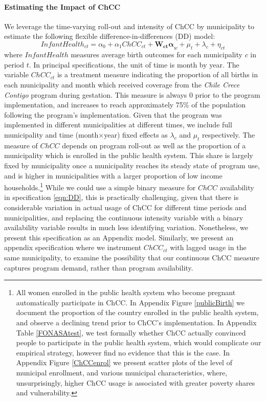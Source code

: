 \documentclass[12pt]{article}
\begin{document}
\begin{spacing}{1.4}
\paragraph{Estimating the Impact of ChCC}
We leverage the time-varying roll-out and intensity of ChCC by
municipality to estimate the following flexible
difference-in-differences (DD) model:
\begin{equation}
  \label{eqn:DD}
  Infant Health_{ct} = \alpha_0 + \alpha_1 ChCC_{ct} + \bm{W_{ct}\alpha}_{w} + \mu_t + \lambda_c + \eta_{ct}
\end{equation}
where $InfantHealth$ measures average birth outcomes for each
municipality $c$ in period $t$.  In principal specifications,
the unit of time is month by year. The variable $ChCC_{ct}$ is
a treatment measure indicating the proportion of all births in
each municipality and month which received coverage from the
\emph{Chile Crece Contigo} program during gestation.  This measure is
always 0 prior to the program implementation, and increases
to reach approximately 75\% of the population following the
program's implementation.  Given that the program
was implemented in different municipalities at different times,
we include full municipality and time (month$\times$year) fixed
effects as $\lambda_c$ and $\mu_t$ respectively.  The measure of
$ChCC$ depends on program roll-out as
well as the proportion of a municipality which is enrolled in
the public health system.  This share is largely fixed by
municipality once a municipality reaches its steady state of
program use, and is higher in municipalities with a larger
proportion of low income households.\footnote{All women enrolled
  in the public health system who become pregnant automatically
  participate in ChCC.  In Appendix Figure \ref{publicBirth} we
  document the proportion of the country enrolled in the public
  health system, and observe a declining trend prior to ChCC's
  implementation.  In Appendix Table \ref{FONASAtest}, we test
  formally whether ChCC actually convinced people to participate
  in the public health system, which would complicate our empirical
  strategy, however find no evidence that this is the case. In
  Appendix Figure \ref{ChCCenrol} we present scatter plots of the
  level of municipal enrollment, and various municipal characteristics,
where, unsurprisingly, higher ChCC usage is associated with
greater poverty shares and vulnerability.}  While we could use
a simple binary measure for $ChCC$ availability in specification
\ref{eqn:DD}, this is practically challenging, given that
there is considerable variation in actual usage of ChCC for
different time periods and municipalities, and replacing the
continuous intensity variable with a binary availability variable
results in much less identifying variation.  Nonetheless, we
present this specification as an Appendix model.  Similarly,
we present an appendix specification where we instrument
$ChCC_{ct}$ with lagged usage in the same municipality, to
examine the possibility that our continuous ChCC measure
captures program demand, rather than program availability.


\end{spacing}
\end{document}

